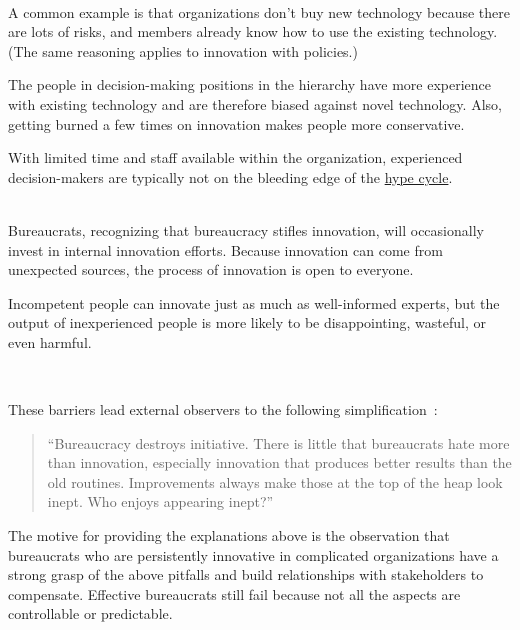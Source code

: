 \ \\

A common example is that organizations don't buy new technology because there are lots of risks, and members already know how to use the existing technology. (The same reasoning applies to innovation with policies.)

The people in decision-making positions in the hierarchy have more experience with existing technology and are therefore biased against novel technology. Also, getting burned a few times on innovation makes people more conservative.

With limited time and staff available within the organization, experienced decision-makers are typically not on the bleeding edge of the \href{https://en.wikipedia.org/wiki/Gartner_hype_cycle}{hype cycle}.

\ \\

Bureaucrats, recognizing that bureaucracy stifles innovation, will occasionally invest in internal innovation efforts. Because innovation can come from unexpected sources, the process of innovation is open to everyone. 

Incompetent people can innovate just as much as well-informed experts, but the output of inexperienced people is more likely to be disappointing, wasteful, or even harmful. 

\ \\

\begin{samepage}
These barriers lead external observers to the following simplification~\cite{1987_Herbert}:
\begin{quote}
``Bureaucracy destroys initiative. There is little that bureaucrats hate more than innovation, especially innovation that produces better results than the old routines.
%
%
Improvements always make those at the top of the heap look inept. Who enjoys appearing inept?''
\end{quote}
\end{samepage}

The motive for providing the explanations above is the observation that bureaucrats who are persistently innovative in complicated organizations have a strong grasp of the above pitfalls and build relationships with stakeholders to compensate. Effective bureaucrats still fail because not all the aspects are controllable or predictable. 

